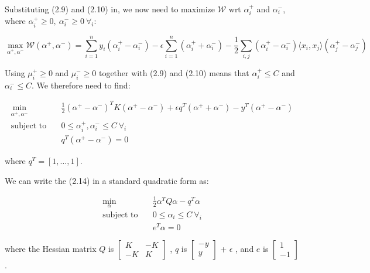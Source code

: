 Substituting (2.9) and (2.10) in, we now need to maximize $\mathcal{W}$ wrt $\alpha_i^+$ and $\alpha_i^-$, where $\alpha_i^+ \geq 0,\ \alpha_i^- \geq 0 \ \forall_i$:

\begin{equation}
    \max_{\alpha^+,\alpha^-} \mathcal{W}(\alpha^+,\alpha^-) = \displaystyle \sum_{i=1}^{n}y_i(\alpha_i^+ - \alpha_i^-)-\epsilon\sum_{i=1}^{n}(\alpha_i^+ + \alpha_i^-)-\frac{1}{2}\sum_{i,j}(\alpha_i^+ - \alpha_i^-)\langle x_i, x_j \rangle(\alpha_j ^+ - \alpha_j ^-) \tag{2.13}
\end{equation}

Using $\mu_i^+ \geq 0$ and $\mu_i^- \geq 0$ together with (2.9) and (2.10) means that $\alpha_i^+ \leq C$ and $\alpha_i^- \leq C$. We therefore need to find:

\begin{equation}
    \begin{aligned}
        \min_{\alpha^+,\alpha^-} \quad & \frac{1}{2}(\alpha^+ - \alpha^-)^TK(\alpha^+ - \alpha^-)+\epsilon q^T(\alpha^+ + \alpha^-)-y^T(\alpha^+ - \alpha^-) \\
            \textrm{subject to} \quad & 0\leq\alpha_i^+,\alpha_i^- \leq C \ \forall_i \\ & q^T(\alpha^+ - \alpha^-)=0
    \end{aligned} \tag{2.14}
\end{equation}

where $q^T = [1, \dots, 1]$.

We can write the (2.14) in a standard quadratic form as:

\begin{equation}
    \begin{aligned}
        \min_{\alpha} \quad & \frac{1}{2}\alpha^T Q\alpha-q^T\alpha \\
            \textrm{subject to} \quad & 0\leq\alpha_i\leq C \ \forall_i \\ & e^T\alpha=0
    \end{aligned} \tag{2.15}
\end{equation}

where the Hessian matrix $Q$ is 
$
\begin{bmatrix}
K & -K\\
-K & K 
\end{bmatrix}$
, $q$ is 
$
\begin{bmatrix}
-y\\
y
\end{bmatrix}$ + $\epsilon$
, and $e$ is 
$
\begin{bmatrix}
1\\
-1
\end{bmatrix}$.

